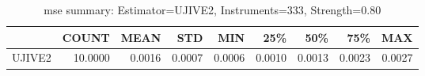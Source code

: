 \begin{table}[ht]
\centering
\caption{mse summary: Estimator=UJIVE2, Instruments=333, Strength=0.80}
\begin{tabular}{lrrrrrrrr}
\toprule
 & COUNT & MEAN & STD & MIN & 25\% & 50\% & 75\% & MAX \\
\midrule
UJIVE2 & 10.0000 & 0.0016 & 0.0007 & 0.0006 & 0.0010 & 0.0013 & 0.0023 & 0.0027 \\
\bottomrule
\end{tabular}
\end{table}
